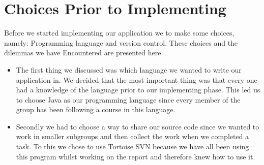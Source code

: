 \chapter{Choices Prior to Implementing}
Before we started implementing our application we to make some choices, namely: Programming language and version control.
These choices and the dilemmas we have Encountered are presented here.

\begin{itemize}
	\item The first thing we discussed was which language we wanted to write our application in.
We decided that the most important thing was that every one had a knowledge of the language prior to our implementing phase.
This led us to choose Java as our programming language since every member of the group has been following a course in this language.

	\item Secondly we had to choose a way to share our source code since we wanted to work in smaller subgroups and then collect the work when we completed a task.
To this we chose to use Tortoise SVN because we have all been using this program whilst working on the report and therefore knew how to use it.
\end{itemize}

